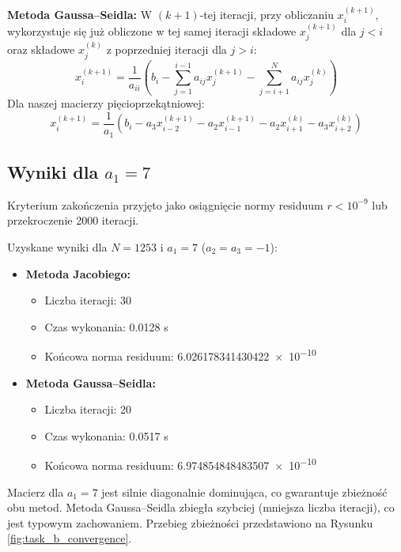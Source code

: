 \documentclass[a4paper, 11pt]{article}
\begin{document}
\textbf{Metoda Gaussa–Seidla:} W $(k+1)$-tej iteracji, przy obliczaniu $x_i^{(k+1)}$, wykorzystuje się już obliczone w tej samej iteracji składowe $x_j^{(k+1)}$ dla $j < i$ oraz składowe $x_j^{(k)}$ z poprzedniej iteracji dla $j > i$:
\begin{equation}
x_i^{(k+1)} = \frac{1}{a_{ii}} \left( b_i - \sum_{j=1}^{i-1} a_{ij} x_j^{(k+1)} - \sum_{j=i+1}^{N} a_{ij} x_j^{(k)} \right)
\end{equation}
Dla naszej macierzy pięcioprzekątniowej:
\begin{equation}
x_i^{(k+1)} = \frac{1}{a_1} \left( b_i - a_3 x_{i-2}^{(k+1)} - a_2 x_{i-1}^{(k+1)} - a_2 x_{i+1}^{(k)} - a_3 x_{i+2}^{(k)} \right)
\label{eq:gauss_seidel_sparse}
\end{equation}

\subsection{Wyniki dla $a_1=7$}
Kryterium zakończenia przyjęto jako osiągnięcie normy residuum $r < 10^{-9}$ lub przekroczenie 2000 iteracji.

Uzyskane wyniki dla $N=1253$ i $a_1=7$ ($a_2=a_3=-1$):
\begin{itemize}
    \item \textbf{Metoda Jacobiego:}
    \begin{itemize}
        \item Liczba iteracji: 30
        \item Czas wykonania: \num{0.0128} s
        \item Końcowa norma residuum: \num{6.026178341430422e-10}
    \end{itemize}
    \item \textbf{Metoda Gaussa–Seidla:}
    \begin{itemize}
        \item Liczba iteracji: 20
        \item Czas wykonania: \num{0.0517} s
        \item Końcowa norma residuum: \num{6.974854848483507e-10}
    \end{itemize}
\end{itemize}
Macierz dla $a_1=7$ jest silnie diagonalnie dominująca, co gwarantuje zbieżność obu metod. Metoda Gaussa–Seidla zbiegła szybciej (mniejsza liczba iteracji), co jest typowym zachowaniem. Przebieg zbieżności przedstawiono na Rysunku \ref{fig:task_b_convergence}.
\end{document}
